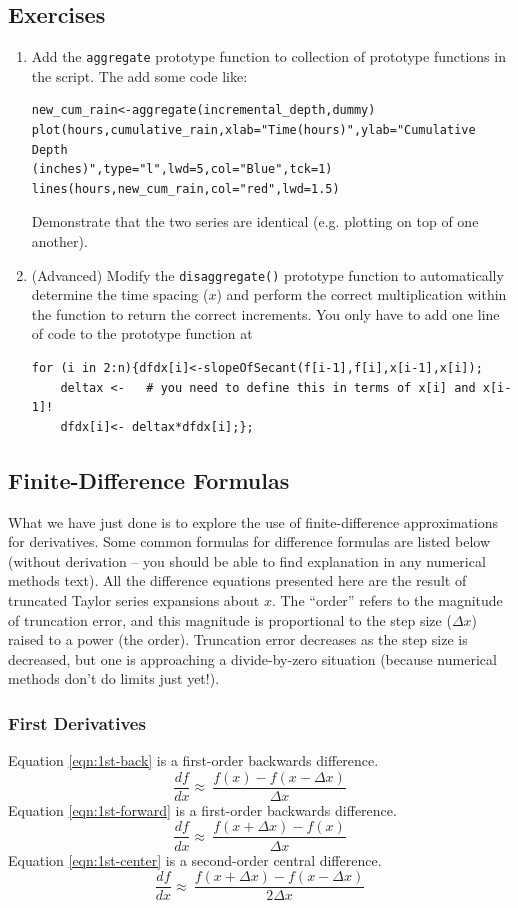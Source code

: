 \subsection{Exercises}
\begin{enumerate}
\item Add the \texttt{aggregate} prototype function to collection of prototype functions in the script.
The add some code like:
\begin{verbatim}
new_cum_rain<-aggregate(incremental_depth,dummy)
plot(hours,cumulative_rain,xlab="Time(hours)",ylab="Cumulative Depth
(inches)",type="l",lwd=5,col="Blue",tck=1)
lines(hours,new_cum_rain,col="red",lwd=1.5)
\end{verbatim}
Demonstrate that the two series are identical (e.g. plotting on top of one another).
\item (Advanced) Modify the \texttt{disaggregate()} prototype function to automatically determine the time spacing ($x$) and perform the correct multiplication within the function to return the correct increments.
You only have to add one line of code to the prototype function at
\begin{verbatim}
for (i in 2:n){dfdx[i]<-slopeOfSecant(f[i-1],f[i],x[i-1],x[i]);
	deltax <-   # you need to define this in terms of x[i] and x[i-1]!
	dfdx[i]<- deltax*dfdx[i];};
\end{verbatim}
\end{enumerate}

\subsection{Finite-Difference Formulas}
What we have just done is to explore the use of finite-difference approximations for derivatives. 
Some common formulas for difference formulas are listed below (without derivation -- you should be able to find explanation in any numerical methods text).
All the difference equations presented here are the result of truncated Taylor series expansions about $x$.
The ``order'' refers to the magnitude of truncation error, and this magnitude is proportional to the step size ($\Delta x$) raised to a power (the order).   
Truncation error decreases as the step size is decreased, but one is approaching a divide-by-zero situation (because numerical methods don't do limits just yet!).
\subsubsection{First Derivatives}
Equation \ref{eqn:1st-back} is a first-order backwards difference.
\begin{equation}
\frac{df}{dx} \approx~ \frac{f(x) - f(x -\Delta x)}{\Delta x}
\label{eqn:1st-back}
\end{equation}
Equation \ref{eqn:1st-forward} is a first-order backwards difference.
\begin{equation}
\frac{df}{dx}  \approx~ \frac{f(x + \Delta x) - f(x)}{\Delta x}
\label{eqn:1st-forward}
\end{equation}
Equation \ref{eqn:1st-center} is a second-order central difference.
\begin{equation}
\frac{df}{dx}  \approx~ \frac{f(x + \Delta x) - f(x -\Delta x)}{2 \Delta x}
\label{eqn:1st-center}
\end{equation}
